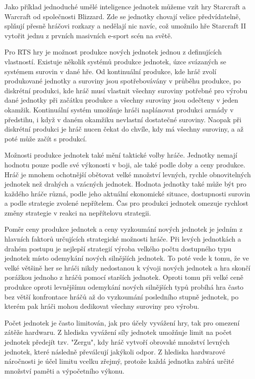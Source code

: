 Jako příklad jednoduché umělé inteligence jednotek můžeme vzít hry Starcraft a Warcraft od společnosti Blizzard. Zde se jednotky chovají velice předvídatelně, splňují přesně hráčovi rozkazy a nedělají nic navíc, což umožnilo hře Starcraft II vytořit jednu z prvních masivních e-sport scén na světě. \cite{http://www.gamasutra.com/php-bin/news_index.php?story=18326}

Pro RTS hry je možnost produkce nových jednotek jednou z definujících vlastností. Existuje několik systémů produkce jednotek, úzce svázaných se systémem surovin v dané hře.  Od kontinuální produkce, kde hráč zvolí produkované jednotky a suroviny jsou spotřebovávány v průběhu produkce, po diskrétní produkci, kde hráč musí vlastnit všechny suroviny potřebné pro výrobu dané jednotky při začátku produkce a všechny suroviny jsou odečteny v jeden okamžik. Kontinuální systém umožňuje hráči naplánovat produkci armády v předstihu, i když v daném okamžiku nevlastní dostatečné suroviny. Naopak při diskrétní produkci je hráč nucen čekat do chvíle, kdy má všechny suroviny, a až poté může začít s produkcí.

Možnosti produkce jednotek také mění taktické volby hráče. Jednotky nemají hodnotu pouze podle své výkonosti v boji, ale také podle doby a ceny produkce. Hráč je mnohem ochotnější obětovat velké množství levných, rychle obnovitelných jednotek než drahých a vzácných jednotek. Hodnota jednotky také může být pro každého hráče různá, podle jeho aktuální ekonomické situace, dostupnosti surovin a podle strategie zvolené nepřítelem. Čas pro produkci jednotek omezuje rychlost změny strategie v reakci na nepřítelovu strategii.

Poměr ceny produkce jednotek a ceny vyzkoumání nových jednotek je jedním z hlavních faktorů určujících strategické možnosti hráče. Při levých jednotkách a drahém postupu je nejlepší strategií výroba velkého počtu dostupného typu jednotek místo odemykání nových silnějších jednotek. To poté vede k tomu, že ve velké většině her se hráči nikdy nedostanou k vývoji nových jednotek a hra skončí porážkou jednoho z hráčů pomocí starších jednotek. Oproti tomu při velké ceně produkce oproti levnějšímu odemykání nových silnějších typů probíhá hra často bez větší konfrontace hráčů až do vyzkoumání posledního stupně jednotek, po kterém pak hráči mohou dedikovat všechny suroviny pro výrobu.

Počet jednotek je často limitován, jak pro účely vyvážení hry, tak pro omezení zátěže hardwaru. Z hlediska vyvážení síly jednotek umožňuje limit na počet jednotek předejít tzv. "Zergu", kdy hráč vytvoří obrovské množství levných jednotek, které následně převálcují jakýkoli odpor. Z hlediska hardwarové náročnosti je účel limitu vcelku zřejmý, protože každá jednotka zabírá určité množství paměti a výpočetního výkonu.

